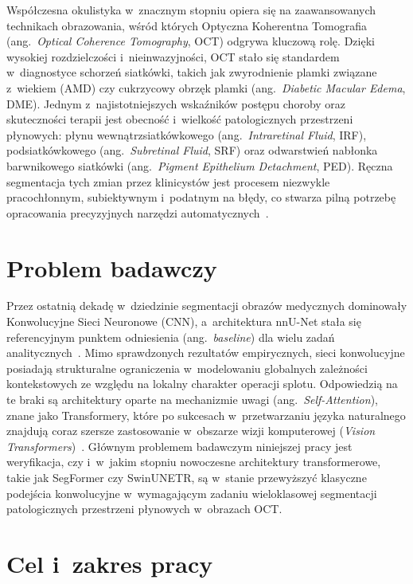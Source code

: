 \documentclass[12pt,a4paper,oneside]{report}
\begin{document}
Współczesna okulistyka w~znacznym stopniu opiera się na zaawansowanych technikach obrazowania, wśród których Optyczna Koherentna Tomografia (ang.~\textit{Optical Coherence Tomography}, OCT) odgrywa kluczową rolę. Dzięki wysokiej rozdzielczości i~nieinwazyjności, OCT stało się standardem w~diagnostyce schorzeń siatkówki, takich jak zwyrodnienie plamki związane z~wiekiem (AMD) czy cukrzycowy obrzęk plamki (ang.~\textit{Diabetic Macular Edema}, DME). Jednym z~najistotniejszych wskaźników postępu choroby oraz skuteczności terapii jest obecność i~wielkość patologicznych przestrzeni płynowych: płynu wewnątrzsiatkówkowego (ang.~\textit{Intraretinal Fluid}, IRF), podsiatkówkowego (ang.~\textit{Subretinal Fluid}, SRF) oraz odwarstwień nabłonka barwnikowego siatkówki (ang.~\textit{Pigment Epithelium Detachment}, PED). Ręczna segmentacja tych zmian przez klinicystów jest procesem niezwykle pracochłonnym, subiektywnym i~podatnym na błędy, co stwarza pilną potrzebę opracowania precyzyjnych narzędzi automatycznych~\cite{retouch2019}.

\section{Problem badawczy}

Przez ostatnią dekadę w~dziedzinie segmentacji obrazów medycznych dominowały Konwolucyjne Sieci Neuronowe (CNN), a~architektura nnU-Net stała się referencyjnym punktem odniesienia (ang.~\textit{baseline}) dla wielu zadań analitycznych~\cite{isensee2021nnu}. Mimo sprawdzonych rezultatów empirycznych, sieci konwolucyjne posiadają strukturalne ograniczenia w~modelowaniu globalnych zależności kontekstowych ze względu na lokalny charakter operacji splotu. Odpowiedzią na te braki są architektury oparte na mechanizmie uwagi (ang.~\textit{Self-Attention}), znane jako Transformery, które po sukcesach w~przetwarzaniu języka naturalnego znajdują coraz szersze zastosowanie w~obszarze wizji komputerowej (\textit{Vision Transformers})~\cite{dosovitskiy2020vit}. Głównym problemem badawczym niniejszej pracy jest weryfikacja, czy i~w~jakim stopniu nowoczesne architektury transformerowe, takie jak SegFormer czy SwinUNETR, są w~stanie przewyższyć klasyczne podejścia konwolucyjne w~wymagającym zadaniu wieloklasowej segmentacji patologicznych przestrzeni płynowych w~obrazach OCT.\@

\section{Cel i~zakres pracy}
\end{document}
